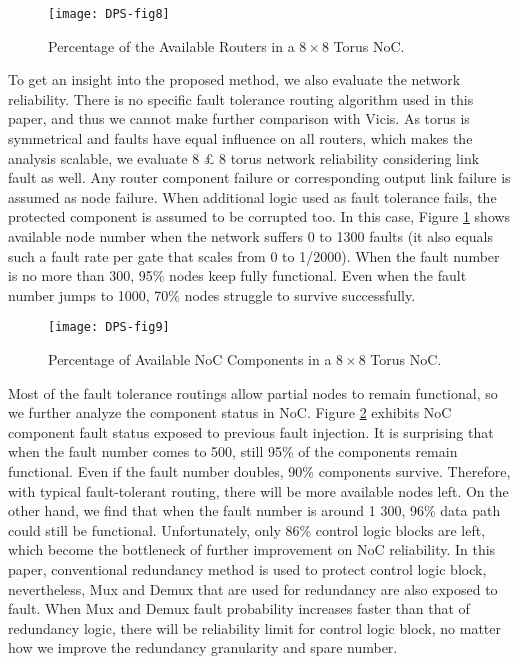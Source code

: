 \begin{figure}[h]
      \centering
        \texttt{[image: DPS-fig8]}
        \caption{Percentage of the Available Routers in a $8 \times 8$ Torus NoC.}
        \label{fig:dps-fig8}
\end{figure}

To get an insight into the proposed method, we also evaluate the network reliability. There is no specific fault tolerance routing algorithm used in this paper, and thus we cannot make further comparison with Vicis. As torus is symmetrical and faults have equal influence on all routers, which makes the analysis scalable, we evaluate 8 £ 8 torus network reliability considering link fault as well. Any router component failure or corresponding output link failure is assumed as node failure. When additional logic used as fault tolerance fails, the protected component is assumed to be corrupted too. In this case, Figure \ref{fig:dps-fig8} shows available node number when the network suffers 0 to 1300 faults (it also equals such a fault rate per gate that scales from 0 to 1/2000). When the fault number is no more than 300, 95\% nodes keep fully functional. Even when the fault number jumps to 1000, 70\% nodes struggle to survive successfully.

\begin{figure}[h]
      \centering
        \texttt{[image: DPS-fig9]}
        \caption{Percentage of Available NoC Components in a $8 \times 8$ Torus NoC.}
        \label{fig:dps-fig9}
\end{figure}


Most of the fault tolerance routings allow partial nodes to remain functional, so we further analyze the component status in NoC. Figure \ref{fig:dps-fig9} exhibits NoC component fault status exposed to previous fault injection. It is surprising that when the fault number comes to 500, still 95\% of the components remain functional. Even if the fault number doubles, 90\% components survive. Therefore, with typical fault-tolerant routing, there will be more available nodes left. On the other hand, we find that when the fault number is around 1 300, 96\% data path could still be functional. Unfortunately, only 86\% control logic blocks are left, which become the bottleneck of further improvement on NoC reliability. In this paper, conventional redundancy method is used to protect control logic block, nevertheless, Mux and Demux that are used for redundancy are also exposed to fault. When Mux and Demux fault probability increases faster than that of redundancy logic, there will be reliability limit for control logic block, no matter how we improve the redundancy granularity and spare number.

